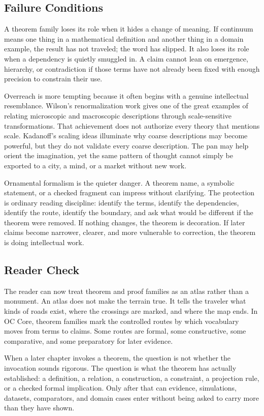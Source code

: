 \documentclass[11pt,a4paper,openany]{book}
\begin{document}
\subsection{Failure Conditions}
A theorem family loses its role when it hides a change of meaning. If continuum means one thing in a mathematical definition and another thing in a domain example, the result has not traveled; the word has slipped. It also loses its role when a dependency is quietly smuggled in. A claim cannot lean on emergence, hierarchy, or contradiction if those terms have not already been fixed with enough precision to constrain their use. \cite{goldenfeld_lectures,kadanoff_scaling}\par
Overreach is more tempting because it often begins with a genuine intellectual resemblance. Wilson's renormalization work gives one of the great examples of relating microscopic and macroscopic descriptions through scale-sensitive transformations. That achievement does not authorize every theory that mentions scale. Kadanoff's scaling ideas illuminate why coarse descriptions may become powerful, but they do not validate every coarse description. The pan may help orient the imagination, yet the same pattern of thought cannot simply be exported to a city, a mind, or a market without new work.\par
Ornamental formalism is the quieter danger. A theorem name, a symbolic statement, or a checked fragment can impress without clarifying. The protection is ordinary reading discipline: identify the terms, identify the dependencies, identify the route, identify the boundary, and ask what would be different if the theorem were removed. If nothing changes, the theorem is decoration. If later claims become narrower, clearer, and more vulnerable to correction, the theorem is doing intellectual work.\par
\subsection{Reader Check}
The reader can now treat theorem and proof families as an atlas rather than a monument. An atlas does not make the terrain true. It tells the traveler what kinds of roads exist, where the crossings are marked, and where the map ends. In OC Core, theorem families mark the controlled routes by which vocabulary moves from terms to claims. Some routes are formal, some constructive, some comparative, and some preparatory for later evidence. \cite{goldenfeld_lectures,kadanoff_scaling}\par
When a later chapter invokes a theorem, the question is not whether the invocation sounds rigorous. The question is what the theorem has actually established: a definition, a relation, a construction, a constraint, a projection rule, or a checked formal implication. Only after that can evidence, simulations, datasets, comparators, and domain cases enter without being asked to carry more than they have shown.\par
\end{document}
